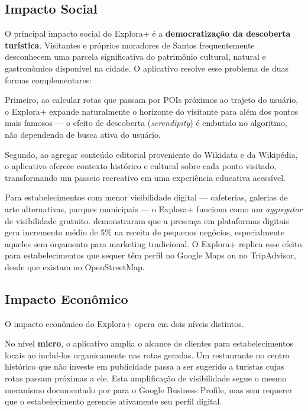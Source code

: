\documentclass[12pt, a4paper]{article}
\begin{document}
\subsection{Impacto Social}

O principal impacto social do Explora+ \'e a \textbf{democratiza\c{c}\~ao da descoberta tur\'istica}. Visitantes e pr\'oprios moradores de Santos frequentemente desconhecem uma parcela significativa do patrim\^onio cultural, natural e gastron\^omico dispon\'ivel na cidade. O aplicativo resolve esse problema de duas formas complementares:

Primeiro, ao calcular rotas que passam por POIs pr\'oximos ao trajeto do usu\'ario, o Explora+ expande naturalmente o horizonte do visitante para al\'em dos pontos mais famosos --- o efeito de descoberta (\textit{serendipity}) \'e embutido no algoritmo, n\~ao dependendo de busca ativa do usu\'ario.

Segundo, ao agregar conte\'udo editorial proveniente do Wikidata e da Wikip\'edia, o aplicativo oferece contexto hist\'orico e cultural sobre cada ponto visitado, transformando um passeio recreativo em uma experi\^encia educativa acess\'ivel.

Para estabelecimentos com menor visibilidade digital --- cafeterias, galerias de arte alternativas, parques municipais --- o Explora+ funciona como um \textit{aggregator} de visibilidade gratuito. \textcite{luca2022} demonstraram que a presen\c{c}a em plataformas digitais gera incremento m\'edio de 5\% na receita de pequenos neg\'ocios, especialmente aqueles sem or\c{c}amento para marketing tradicional. O Explora+ replica esse efeito para estabelecimentos que sequer t\^em perfil no Google Maps ou no TripAdvisor, desde que existam no OpenStreetMap.

\subsection{Impacto Econ\^omico}

O impacto econ\^omico do Explora+ opera em dois n\'iveis distintos.

No n\'ivel \textbf{micro}, o aplicativo amplia o alcance de clientes para estabelecimentos locais ao inclu\'i-los organicamente nas rotas geradas. Um restaurante no centro hist\'orico que n\~ao investe em publicidade passa a ser sugerido a turistas cujas rotas passam pr\'oximas a ele. Esta amplifica\c{c}\~ao de visibilidade segue o mesmo mecanismo documentado por \textcite{shankar2025} para o Google Business Profile, mas sem requerer que o estabelecimento gerencie ativamente seu perfil digital.
\end{document}
